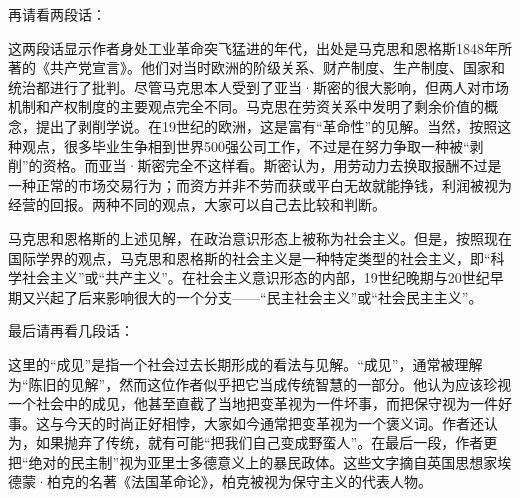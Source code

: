 再请看两段话：


这两段话显示作者身处工业革命突飞猛进的年代，出处是马克思和恩格斯1848年所著的《共产党宣言》。他们对当时欧洲的阶级关系、财产制度、生产制度、国家和统治都进行了批判。尽管马克思本人受到了亚当·斯密的很大影响，但两人对市场机制和产权制度的主要观点完全不同。马克思在劳资关系中发明了剩余价值的概念，提出了剥削学说。在19世纪的欧洲，这是富有“革命性”的见解。当然，按照这种观点，很多毕业生争相到世界500强公司工作，不过是在努力争取一种被“剥削”的资格。而亚当·斯密完全不这样看。斯密认为，用劳动力去换取报酬不过是一种正常的市场交易行为；而资方并非不劳而获或平白无故就能挣钱，利润被视为经营的回报。两种不同的观点，大家可以自己去比较和判断。

马克思和恩格斯的上述见解，在政治意识形态上被称为社会主义。但是，按照现在国际学界的观点，马克思和恩格斯的社会主义是一种特定类型的社会主义，即“科学社会主义”或“共产主义”。在社会主义意识形态的内部，19世纪晚期与20世纪早期又兴起了后来影响很大的一个分支——“民主社会主义”或“社会民主主义”。

最后请再看几段话：


这里的“成见”是指一个社会过去长期形成的看法与见解。“成见”，通常被理解为“陈旧的见解”，然而这位作者似乎把它当成传统智慧的一部分。他认为应该珍视一个社会中的成见，他甚至直截了当地把变革视为一件坏事，而把保守视为一件好事。这与今天的时尚正好相悖，大家如今通常把变革视为一个褒义词。作者还认为，如果抛弃了传统，就有可能“把我们自己变成野蛮人”。在最后一段，作者更把“绝对的民主制”视为亚里士多德意义上的暴民政体。这些文字摘自英国思想家埃德蒙·柏克的名著《法国革命论》，柏克被视为保守主义的代表人物。

